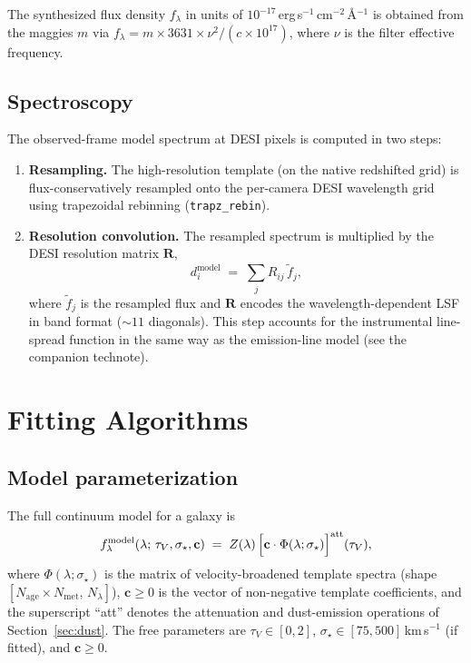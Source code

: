 \documentclass[12pt]{article}
\newcommand{\tauv}{\tau_{V}}
\newcommand{\vdisp}{\sigma_{\star}}
\newcommand{\flam}{f_\lambda}
\newcommand{\R}{\mathbf{R}}
\newcommand{\cc}{\mathbf{c}}
\newcommand{\C}{c}                 %
\begin{document}
The synthesized flux density $\flam$ in units of
$10^{-17}$\,erg\,s$^{-1}$\,cm$^{-2}$\,\AA$^{-1}$ is obtained from the
maggies $m$ via $\flam = m \times 3631 \times \nu^2/(\C \times 10^{17})$,
where $\nu$ is the filter effective frequency.

\subsection{Spectroscopy}
\label{ssec:synthspec}

The observed-frame model spectrum at DESI pixels is computed in two steps:
\begin{enumerate}
  \item \textbf{Resampling.}  The high-resolution template (on the native
    redshifted grid) is flux-conservatively resampled onto the per-camera
    DESI wavelength grid using trapezoidal rebinning (\texttt{trapz\_rebin}).
  \item \textbf{Resolution convolution.}  The resampled spectrum is multiplied
    by the DESI resolution matrix $\R$,
    \begin{equation}
      d_i^{\mathrm{model}} \;=\; \sum_j R_{ij}\,\tilde{f}_j,
    \end{equation}
    where $\tilde{f}_j$ is the resampled flux and $\R$ encodes the
    wavelength-dependent LSF in band format (${\sim}11$ diagonals).
    This step accounts for the instrumental line-spread function in the
    same way as the emission-line model (see the companion technote).
\end{enumerate}


\section{Fitting Algorithms}
\label{sec:fitting}

\subsection{Model parameterization}
\label{ssec:params}

The full continuum model for a galaxy is
\begin{equation}
  \flam^{\mathrm{model}}(\lambda;\,\tauv,\vdisp,\cc)
  \;=\; Z(\lambda)\,
        \Bigl[\cc \cdot \Phi(\lambda;\vdisp)\Bigr]^{\mathrm{att}}(\tauv),
  \label{eq:model}
\end{equation}
where $\Phi(\lambda;\vdisp)$ is the matrix of velocity-broadened template
spectra (shape $[N_{\mathrm{age}} \times N_{\mathrm{met}},\,N_\lambda]$),
$\cc \geq 0$ is the vector of non-negative template coefficients, and the
superscript ``att'' denotes the attenuation and dust-emission operations of
Section~\ref{sec:dust}.  The free parameters are $\tauv \in [0, 2]$,
$\vdisp \in [75, 500]$\,km\,s$^{-1}$ (if fitted), and $\cc \geq 0$.
\end{document}

